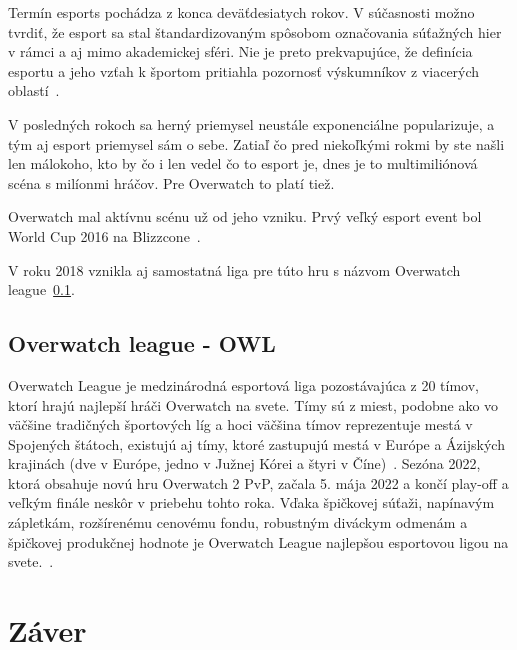 \documentclass[10pt,oneside,slovak,a4paper]{article}
\begin{document}
Termín esports pochádza z konca deväťdesiatych rokov. V súčasnosti možno tvrdiť, že esport sa stal štandardizovaným spôsobom označovania súťažných hier v rámci a aj mimo akademickej sféri. Nie je preto prekvapujúce, že definícia esportu a jeho vzťah k športom pritiahla pozornosť výskumníkov z viacerých oblastí~\cite{Overwatchesport}.

V posledných rokoch sa herný priemysel neustále exponenciálne popularizuje, a tým aj esport priemysel sám o sebe. Zatiaľ čo pred niekoľkými rokmi by ste 
našli len málokoho, kto by čo i len vedel čo to esport je, dnes je to multimiliónová scéna s milíonmi hráčov. Pre Overwatch to platí tiež.

Overwatch mal aktívnu scénu už od jeho vzniku. Prvý veľký esport event bol World Cup 2016 na Blizzcone~\cite{Overwatchesport}.

V roku 2018 vznikla aj samostatná liga pre túto hru s názvom Overwatch league~\ref{Overwatch league - OWL}.

\subsection{Overwatch league - OWL} \label{Overwatch league - OWL}

Overwatch League je medzinárodná esportová liga pozostávajúca z 20 tímov, ktorí hrajú najlepší hráči Overwatch na svete. Tímy sú z miest, podobne ako vo väčšine tradičných športových líg a hoci väčšina tímov reprezentuje mestá v Spojených štátoch, existujú aj tímy, ktoré zastupujú mestá v Európe a Ázijských krajinách (dve v Európe, jedno v Južnej Kórei a štyri v Číne)~\cite{Overwatchesport}. Sezóna 2022, ktorá obsahuje novú hru Overwatch 2 PvP, začala 5. mája 2022 a končí play-off a veľkým finále neskôr v priebehu tohto roka. Vďaka špičkovej súťaži, napínavým zápletkám, rozšírenému cenovému fondu, robustným diváckym odmenám a špičkovej produkčnej hodnote je Overwatch League najlepšou esportovou ligou na svete.~\cite{Overwatchsite}.



\section{Záver} \label{zaver} %






\end{document}
